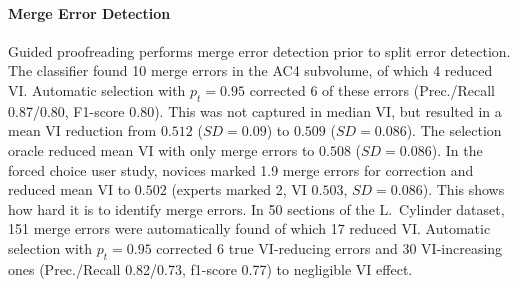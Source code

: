 \paragraph{Merge Error Detection} Guided proofreading performs merge error detection prior to split error detection. The classifier found 10 merge errors in the AC4 subvolume, of which 4 reduced VI. Automatic selection with $p_t=0.95$ corrected 6 of these errors (Prec./Recall 0.87/0.80, F1-score 0.80). This was not captured in median VI, but resulted in a mean VI reduction from $0.512$ ($SD=0.09$) to $0.509$ ($SD=0.086$). The selection oracle reduced mean VI with only merge errors to $0.508$ ($SD=0.086$). In the forced choice user study, novices marked 1.9 merge errors for correction and reduced mean VI to $0.502$ (experts marked 2, VI $0.503$, $SD=0.086$). This shows how hard it is to identify merge errors. In 50 sections of the L.~Cylinder dataset, 151 merge errors were automatically found of which 17 reduced VI. Automatic selection with $p_t=0.95$ corrected 6 true VI-reducing errors and 30 VI-increasing ones (Prec./Recall 0.82/0.73, f1-score 0.77) to negligible VI effect. 

